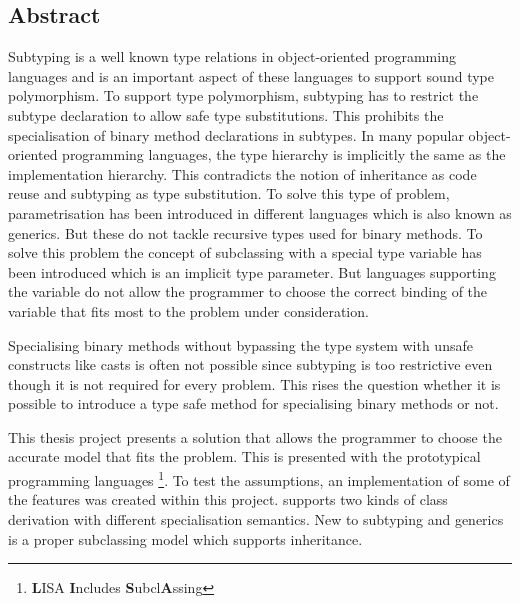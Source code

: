 %
%
\subsection*{Abstract}
Subtyping is a well known type relations in object-oriented
programming languages and is an important aspect of these languages
to support sound type polymorphism. To support type polymorphism,
subtyping has to restrict the subtype declaration to allow safe type
substitutions. This prohibits the specialisation of binary method declarations 
in subtypes. In many popular object-oriented programming languages, the type
hierarchy is implicitly the same as the implementation hierarchy. This
contradicts the notion of inheritance as code reuse and subtyping as type
substitution. To solve this type of problem, parametrisation has been introduced in
different languages which is also known as generics. But these do not
tackle recursive types used for binary methods. To solve this problem
the concept of subclassing with a special type variable \mytype has been
introduced which is an implicit type parameter. But languages supporting
the \mytype variable do not allow the programmer to choose the correct
binding of the variable that fits most to the problem under consideration.

Specialising binary methods without bypassing the type system with
unsafe constructs like casts is often not possible since subtyping is
too restrictive even though it is not required for every problem. This
rises the question whether it is possible to introduce a type safe method
for specialising binary methods or not.

This thesis project presents a solution that allows the programmer to
choose the accurate model that fits the problem. This is presented with
the prototypical programming languages \ooplss\footnote{{\bf L}ISA
{\bf I}ncludes {\bf S}ubcl{\bf A}ssing}. To test the assumptions,
an implementation of some of the features was created within this
project. \ooplss supports two kinds of class derivation with different
specialisation semantics. New to subtyping and generics is a proper
subclassing model which supports inheritance.

